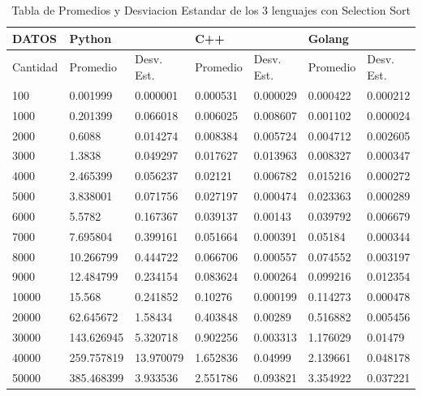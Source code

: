 \documentclass[12pt]{article} %
\begin{document}
\begin{table}[H]
    \def\arraystretch{1.3}
    \centering
    \begin{tabular}{|l|l|l|l|l|l|l|}
    \hline        
        DATOS & Python & ~ & C++ & ~ & Golang & ~ \\ \hline
        Cantidad & Promedio & Desv. Est. & Promedio & Desv. Est. & Promedio & Desv. Est. \\ \hline
        100 & 0.001999 & 0.000001 & 0.000531 & 0.000029 & 0.000422 & 0.000212 \\ \hline
        1000 & 0.201399 & 0.066018 & 0.006025 & 0.008607 & 0.001102 & 0.000024 \\ \hline
        2000 & 0.6088 & 0.014274 & 0.008384 & 0.005724 & 0.004712 & 0.002605 \\ \hline
        3000 & 1.3838 & 0.049297 & 0.017627 & 0.013963 & 0.008327 & 0.000347 \\ \hline
        4000 & 2.465399 & 0.056237 & 0.02121 & 0.006782 & 0.015216 & 0.000272 \\ \hline
        5000 & 3.838001 & 0.071756 & 0.027197 & 0.000474 & 0.023363 & 0.000289 \\ \hline
        6000 & 5.5782 & 0.167367 & 0.039137 & 0.00143 & 0.039792 & 0.006679 \\ \hline
        7000 & 7.695804 & 0.399161 & 0.051664 & 0.000391 & 0.05184 & 0.000344 \\ \hline
        8000 & 10.266799 & 0.444722 & 0.066706 & 0.000557 & 0.074552 & 0.003197 \\ \hline
        9000 & 12.484799 & 0.234154 & 0.083624 & 0.000264 & 0.099216 & 0.012354 \\ \hline
        10000 & 15.568 & 0.241852 & 0.10276 & 0.000199 & 0.114273 & 0.000478 \\ \hline
        20000 & 62.645672 & 1.58434 & 0.403848 & 0.00289 & 0.516882 & 0.005456 \\ \hline
        30000 & 143.626945 & 5.320718 & 0.902256 & 0.003313 & 1.176029 & 0.01479 \\ \hline
        40000 & 259.757819 & 13.970079 & 1.652836 & 0.04999 & 2.139661 & 0.048178 \\ \hline
        50000 & 385.468399 & 3.933536 & 2.551786 & 0.093821 & 3.354922 & 0.037221 \\ \hline
    \end{tabular}
    \caption{Tabla de Promedios y Desviacion Estandar de los 3 lenguajes con Selection Sort}
\end{table}
\end{document}
